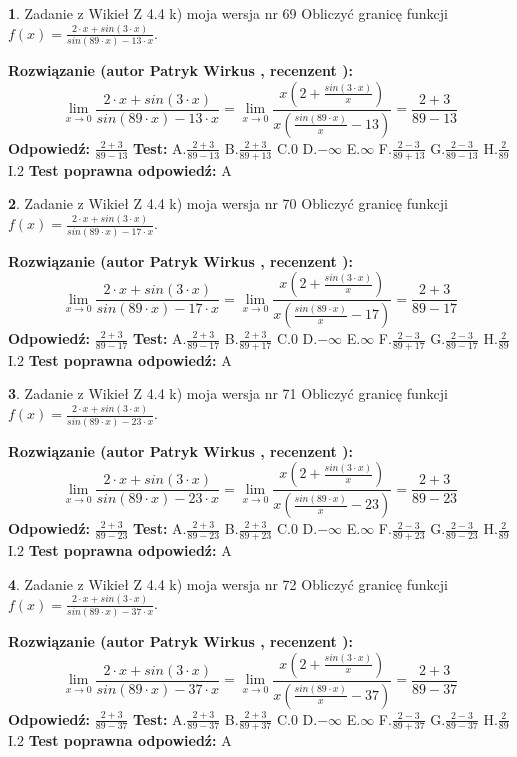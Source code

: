 \documentclass[12pt, a4paper]{article}
\theoremstyle{definition} %
\newtheorem{zad}{}
\newcommand{\zadStart}[1]{\begin{zad}#1\newline}
\newcommand{\zadStop}{\end{zad}}
\newcommand{\rozwStart}[2]{\noindent \textbf{Rozwiązanie (autor #1 , recenzent #2): }\newline}
\newcommand{\rozwStop}{\newline}
\newcommand{\odpStart}{\noindent \textbf{Odpowiedź:}\newline}
\newcommand{\odpStop}{\newline}
\newcommand{\testStart}{\noindent \textbf{Test:}\newline}
\newcommand{\testStop}{\newline}
\newcommand{\kluczStart}{\noindent \textbf{Test poprawna odpowiedź:}\newline}
\newcommand{\kluczStop}{\newline}
\begin{document}
\zadStart{Zadanie z Wikieł Z 4.4 k) moja wersja nr 69}
Obliczyć granicę funkcji $f(x)=\frac{2\cdot x +sin(3\cdot x)}{sin(89\cdot x) -13\cdot x}$.
\zadStop
\rozwStart{Patryk Wirkus}{}
$$\lim\limits_{x\to 0}\frac{2\cdot x +sin(3\cdot x)}{sin(89\cdot x) -13\cdot x}
=\lim\limits_{x\to 0}\frac{x(2+\frac{sin(3\cdot x)}{x})}{x(\frac{sin(89\cdot x)}{x}-13)}
=\frac{2+3}{89-13}$$
\rozwStop
\odpStart
$\frac{2+3}{89-13}$
\odpStop
\testStart
A.$\frac{2+3}{89-13}$
B.$\frac{2+3}{89+13}$
C.$0$
D.$-\infty$
E.$\infty$
F.$\frac{2-3}{89+13}$
G.$\frac{2-3}{89-13}$
H.$\frac{2}{89}$
I.$2$
\testStop
\kluczStart
A
\kluczStop



\zadStart{Zadanie z Wikieł Z 4.4 k) moja wersja nr 70}
Obliczyć granicę funkcji $f(x)=\frac{2\cdot x +sin(3\cdot x)}{sin(89\cdot x) -17\cdot x}$.
\zadStop
\rozwStart{Patryk Wirkus}{}
$$\lim\limits_{x\to 0}\frac{2\cdot x +sin(3\cdot x)}{sin(89\cdot x) -17\cdot x}
=\lim\limits_{x\to 0}\frac{x(2+\frac{sin(3\cdot x)}{x})}{x(\frac{sin(89\cdot x)}{x}-17)}
=\frac{2+3}{89-17}$$
\rozwStop
\odpStart
$\frac{2+3}{89-17}$
\odpStop
\testStart
A.$\frac{2+3}{89-17}$
B.$\frac{2+3}{89+17}$
C.$0$
D.$-\infty$
E.$\infty$
F.$\frac{2-3}{89+17}$
G.$\frac{2-3}{89-17}$
H.$\frac{2}{89}$
I.$2$
\testStop
\kluczStart
A
\kluczStop



\zadStart{Zadanie z Wikieł Z 4.4 k) moja wersja nr 71}
Obliczyć granicę funkcji $f(x)=\frac{2\cdot x +sin(3\cdot x)}{sin(89\cdot x) -23\cdot x}$.
\zadStop
\rozwStart{Patryk Wirkus}{}
$$\lim\limits_{x\to 0}\frac{2\cdot x +sin(3\cdot x)}{sin(89\cdot x) -23\cdot x}
=\lim\limits_{x\to 0}\frac{x(2+\frac{sin(3\cdot x)}{x})}{x(\frac{sin(89\cdot x)}{x}-23)}
=\frac{2+3}{89-23}$$
\rozwStop
\odpStart
$\frac{2+3}{89-23}$
\odpStop
\testStart
A.$\frac{2+3}{89-23}$
B.$\frac{2+3}{89+23}$
C.$0$
D.$-\infty$
E.$\infty$
F.$\frac{2-3}{89+23}$
G.$\frac{2-3}{89-23}$
H.$\frac{2}{89}$
I.$2$
\testStop
\kluczStart
A
\kluczStop



\zadStart{Zadanie z Wikieł Z 4.4 k) moja wersja nr 72}
Obliczyć granicę funkcji $f(x)=\frac{2\cdot x +sin(3\cdot x)}{sin(89\cdot x) -37\cdot x}$.
\zadStop
\rozwStart{Patryk Wirkus}{}
$$\lim\limits_{x\to 0}\frac{2\cdot x +sin(3\cdot x)}{sin(89\cdot x) -37\cdot x}
=\lim\limits_{x\to 0}\frac{x(2+\frac{sin(3\cdot x)}{x})}{x(\frac{sin(89\cdot x)}{x}-37)}
=\frac{2+3}{89-37}$$
\rozwStop
\odpStart
$\frac{2+3}{89-37}$
\odpStop
\testStart
A.$\frac{2+3}{89-37}$
B.$\frac{2+3}{89+37}$
C.$0$
D.$-\infty$
E.$\infty$
F.$\frac{2-3}{89+37}$
G.$\frac{2-3}{89-37}$
H.$\frac{2}{89}$
I.$2$
\testStop
\kluczStart
A
\kluczStop
\end{document}
